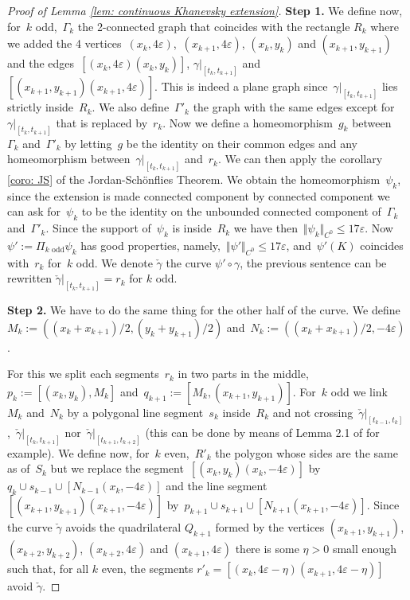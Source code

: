 \documentclass[10pt]{amsart}
\begin{document}
\begin{proof}[Proof of Lemma \ref{lem: continuous Khanevsky extension}]
\medskip

\noindent \textbf{Step 1.} We define now, for~$k$ odd,~$\Gamma_{k}$ the 2-connected graph that coincides with the rectangle $R_k$ where we added the 4 vertices~$(x_k,4\varepsilon)$,~$(x_{k+1},4\varepsilon)$, $(x_k,y_k)$ and $(x_{k+1},y_{k+1})$ and the edges~$[(x_{k},4\varepsilon)(x_{k},y_{k})]$, $\gamma\vert_{[t_k,t_{k+1}]}$ and $[(x_{k+1},y_{k+1})(x_{k+1},4\varepsilon)]$. This is indeed a plane graph since~$\gamma\vert_{[t_k,t_{k+1}]}$ lies strictly inside~$R_k$. We also define~$\Gamma'_k$ the graph with the same edges except for~$\gamma\vert_{[t_k,t_{k+1}]}$ that is replaced by~$r_k$.
Now we define a homeomorphism~$g_k$ between~$\Gamma_k$ and~$\Gamma'_{k}$ by letting~$g$ be the identity on their common edges and any homeomorphism between~$\gamma\vert_{[t_k,t_{k+1}]}$ and~$r_k$. We can then apply the corollary \ref{coro: JS} of the Jordan-Schönflies Theorem. We obtain the homeomorphism~$\psi_k$, since the extension is made connected component by connected component we can ask for~$\psi_k$ to be the identity on the unbounded connected component of~$\Gamma_k$ and~$\Gamma'_k$. Since the support of~$\psi_k$ is inside~$R_k$ we have then~$\Vert \psi_k \Vert_{C^0}\leq 17\varepsilon$. Now~$\psi':=\Pi_{k \text{ odd}} \psi_k$ has good properties, namely,~$\Vert \psi' \Vert_{C^0}\leq 17 \varepsilon$, and~$\psi'(K)$ coincides with~$r_k$ for~$k$ odd. We denote $\check \gamma$ the curve $\psi' \circ \gamma$, the previous sentence can be rewritten $\check \gamma \vert_{[t_{k},t_{k+1}]} = r_k$ for $k$ odd.

\medskip

\noindent \textbf{Step 2.} We have to do the same thing for the other half of the curve. We define~$M_k:=((x_k+x_{k+1})/2,(y_k+y_{k+1})/2)$ and~$N_k:=((x_k+x_{k+1})/2,-4\varepsilon)$.

For this we split each segments~$r_k$ in two parts in the middle,~$p_k:=[(x_k,y_k),M_k]$ and~$q_{k+1}:=[M_k,(x_{k+1},y_{k+1})]$. For~$k$ odd we link~$M_k$ and~$N_k$ by a polygonal line segment~$s_k$ inside~$R_k$ and not crossing~$\check\gamma\vert_{[t_{k-1},t_k]}$,~$\check\gamma\vert_{[t_k,t_{k+1}]}$ nor~$\check\gamma\vert_{[t_{k+1},t_{k+2}]}$ (this can be done by means of Lemma 2.1 of \cite{Thomassen} for example). We define now, for~$k$ even,~$R'_k$ the polygon whose sides are the same as of~$S_k$ but we replace the segment~$[(x_{k},y_{k})(x_{k},-4\varepsilon)]$ by~$q_k\cup s_{k-1} \cup [N_{k-1}(x_{k},-4\varepsilon)]$ and the line segment~$[(x_{k+1},y_{k+1})(x_{k+1},-4\varepsilon)]$ by~$p_{k+1}\cup s_{k+1} \cup [N_{k+1}(x_{k+1},-4\varepsilon)]$. Since the curve $\check{\gamma}$ avoids the quadrilateral $Q_{k+1}$ formed by the vertices $(x_{k+1}, y_{k+1})$, $(x_{k+2}, y_{k+2})$, $(x_{k+2}, 4\varepsilon)$ and $(x_{k+1}, 4\varepsilon)$ there is some $\eta >0$ small enough such that, for all $k$ even, the segments $r'_k=[(x_{k}, 4\varepsilon-\eta)(x_{k+1}, 4\varepsilon-\eta)]$ avoid $\check{\gamma}$.


\end{proof}
\end{document}
